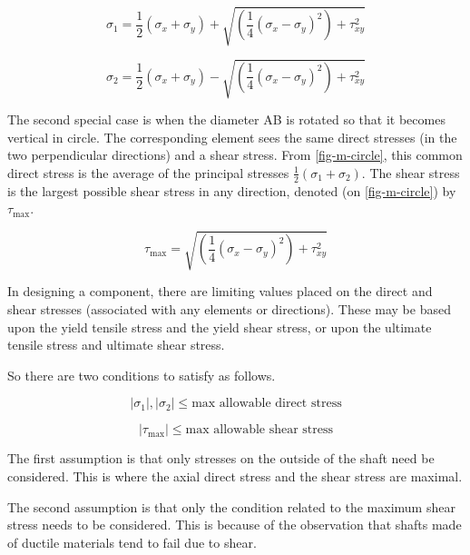 \begin{equation}
  \sigma_1 = \frac{1}{2}(\sigma_x+\sigma_y) + \sqrt{\left(\frac{1}{4}(\sigma_x-\sigma_y)^2\right)+\tau_{xy}^2}
\end{equation}

\begin{equation}
  \sigma_2 = \frac{1}{2}(\sigma_x+\sigma_y) - \sqrt{\left(\frac{1}{4}(\sigma_x-\sigma_y)^2\right)+\tau_{xy}^2}
\end{equation}

The second special case is when the diameter AB is rotated so that it becomes vertical in circle. The corresponding element sees the same direct stresses (in the two perpendicular directions) and a shear stress. From \cref{fig-m-circle}, this common direct stress is the average of the principal stresses \(\frac{1}{2}(\sigma_1+\sigma_2)\). The shear stress is the largest possible shear stress in any direction, denoted (on \cref{fig-m-circle}) by \(\tau_{\max}\).

\begin{equation}
  \tau_{\max} = \sqrt{\left(\frac{1}{4}(\sigma_x-\sigma_y)^2\right)+\tau_{xy}^2}
  \label{equ:tau-max}
\end{equation}

In designing a component, there are limiting values placed on the direct and shear stresses (associated with any elements or directions). These may be based upon the yield tensile stress and the yield shear stress, or upon the ultimate tensile stress and ultimate shear stress.

So there are two conditions to satisfy as follows.

\begin{equation}
|\sigma_1|,|\sigma_2| \leq \text{max\ allowable\ direct\ stress}
\end{equation}

\begin{equation}
|\tau_{\max}| \leq \text{max\ allowable\ shear\ stress}
\end{equation}

The first assumption is that only stresses on the outside of the shaft need be considered. This is where the axial direct stress and the shear stress are maximal.

The second assumption is that only the condition related to the maximum shear stress needs to be considered. This is because of the observation that shafts made of ductile materials tend to fail due to shear.

